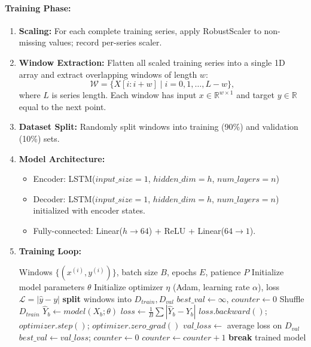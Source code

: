 \documentclass[10pt,twocolumn]{article}
\begin{document}
	\paragraph{Training Phase:}
	\begin{enumerate}
		\item \textbf{Scaling:} For each complete training series, apply RobustScaler to non-missing values; record per-series scaler.
		\item \textbf{Window Extraction:} Flatten all scaled training series into a single 1D array and extract overlapping windows of length $w$:
		\[
		\mathcal{W} = \{X[i:i+w] \mid i = 0,1,\dots,L-w\},
		\]
		where $L$ is series length. Each window has input $x \in \mathbb{R}^{w\times1}$ and target $y \in \mathbb{R}$ equal to the next point.
		\item \textbf{Dataset Split:} Randomly split windows into training (90\%) and validation (10\%) sets.
		\item \textbf{Model Architecture:} 
		\begin{itemize}
			\item Encoder: LSTM($input\_size=1$, $hidden\_dim=h$, $num\_layers=n$)  
			\item Decoder: LSTM($input\_size=1$, $hidden\_dim=h$, $num\_layers=n$) initialized with encoder states.  
			\item Fully-connected: Linear($h\to64$) + ReLU + Linear($64\to1$).
		\end{itemize}
		\item \textbf{Training Loop:}
		\begin{algorithm}[H]
			\caption{Train LSTM Autoencoder}
			\begin{algorithmic}[1]
				\Require Windows $\{(x^{(i)}, y^{(i)})\}$, batch size $B$, epochs $E$, patience $P$
				\State Initialize model parameters $\theta$
				\State Initialize optimizer $\eta$ (Adam, learning rate $\alpha$), loss $\mathcal{L}=|\hat{y}-y|$
				\State \textbf{split} windows into $D_{train}, D_{val}$
				\State $best\_val \gets \infty$, $counter \gets 0$
				\State Shuffle $D_{train}$
				\State $\hat{Y}_b \gets model(X_b;\theta)$
				\State $loss \gets \frac{1}{B} \sum |\hat{Y}_b - Y_b|$
				\State $loss.backward()$; $optimizer.step()$; $optimizer.zero\_grad()$
				\EndFor
				\State $val\_loss \gets$ average loss on $D_{val}$
				\State $best\_val \gets val\_loss$; $counter \gets 0$
				\Else
				\State $counter \gets counter + 1$
				\State \textbf{break}  
				\EndIf
				\EndIf
				\EndFor
				\State \Return trained model
			\end{algorithmic}
		\end{algorithm}
	\end{enumerate}
	
\end{document}
